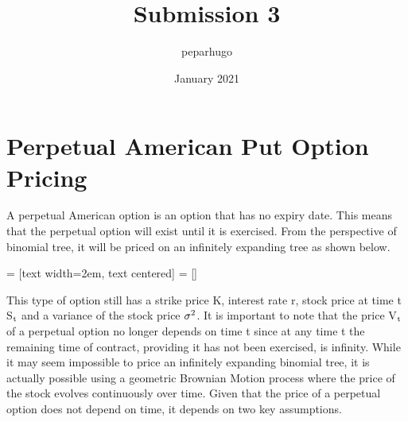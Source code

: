 \documentclass{article}
\title{Submission 3}
\author{peparhugo}
\date{January 2021}
\begin{document}
\maketitle

\section{Perpetual American Put Option Pricing}
A perpetual American option is an option that has no expiry date. This means that the perpetual option will exist until it is exercised. From the perspective of binomial tree, it will be priced on an infinitely expanding tree as shown below.

 = [text width=2em, text centered]
 = []

This type of option still has a strike price K, interest rate r, stock price at time t S$\textsubscript{t}$ and a variance of the stock price $\sigma\textsuperscript{2}$. It is important to note that the price V$\textsubscript{t}$ of a perpetual option no longer depends on time t since at any time t the remaining time of contract, providing it has not been exercised, is infinity\cite{amer_opts}. While it may seem impossible to price an infinitely expanding binomial tree, it is actually possible using a geometric Brownian Motion process where the price of the stock evolves continuously over time. Given that the price of a perpetual option does not depend on time, it depends on two key assumptions.
\end{document}
